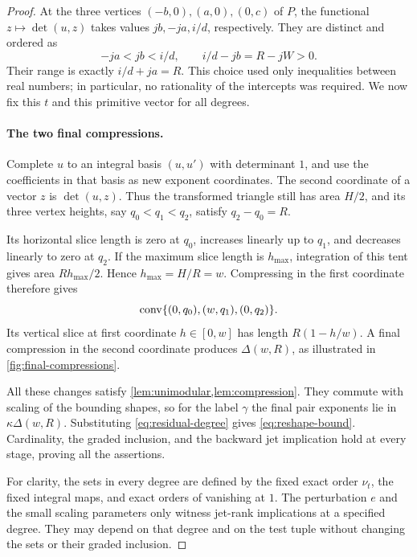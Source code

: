 \begin{proof}
At the three vertices $(-b,0),(a,0),(0,c)$ of $P$, the functional $z\mapsto\det(u,z)$ takes values $jb,-ja,i/d$, respectively.  They are distinct and ordered as
\begin{equation}\label{eq:vertex-heights}
 -ja<jb<i/d,
 \qquad i/d-jb=R-jW>0.
\end{equation}
Their range is exactly $i/d+ja=R$.  This choice used only inequalities between real numbers; in particular, no rationality of the intercepts was required.  We now fix this $t$ and this primitive vector for all degrees.

\paragraph{The two final compressions.}
Complete $u$ to an integral basis $(u,u')$ with determinant $1$, and use the coefficients in that basis as new exponent coordinates.  The second coordinate of a vector $z$ is $\det(u,z)$.  Thus the transformed triangle still has area $H/2$, and its three vertex heights, say $q_0<q_1<q_2$, satisfy $q_2-q_0=R$.

Its horizontal slice length is zero at $q_0$, increases linearly up to $q_1$, and decreases linearly to zero at $q_2$.  If the maximum slice length is $h_{\max}$, integration of this tent gives area $Rh_{\max}/2$.  Hence $h_{\max}=H/R=w$.  Compressing in the first coordinate therefore gives
\begin{equation}\label{eq:tent-triangle}
 \operatorname{conv}\{(0,q_0),(w,q_1),(0,q_2)\}.
\end{equation}
Its vertical slice at first coordinate $h\in[0,w]$ has length $R(1-h/w)$.  A final compression in the second coordinate produces $\Delta(w,R)$, as illustrated in \cref{fig:final-compressions}.

\ReshapingCompressionFigure

All these changes satisfy \cref{lem:unimodular,lem:compression}.  They commute with scaling of the bounding shapes, so for the label $\gamma$ the final pair exponents lie in $\kappa\Delta(w,R)$.  Substituting \eqref{eq:residual-degree} gives \eqref{eq:reshape-bound}.  Cardinality, the graded inclusion, and the backward jet implication hold at every stage, proving all the assertions.

For clarity, the sets in every degree are defined by the fixed exact order $\nu_t$, the fixed integral maps, and exact orders of vanishing at $1$. The perturbation $e$ and the small scaling parameters only witness jet-rank implications at a specified degree.  They may depend on that degree and on the test tuple without changing the sets or their graded inclusion.
\end{proof}
